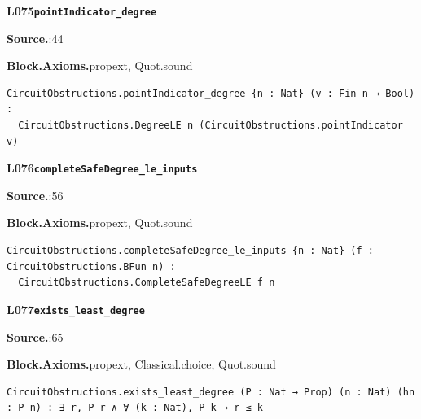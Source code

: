 \par\medskip\noindent\begin{minipage}{\textwidth}
{\small\bfseries L075\enspace\texttt{pointIndicator\_degree}\par}
{\footnotesize\raggedright\textbf{Source.}\enspace{}:44\par
\textbf{Block.}\quad\textbf{Axioms.}\enspace propext, Quot.sound\par}\nopagebreak
\begin{lstlisting}
CircuitObstructions.pointIndicator_degree {n : Nat} (v : Fin n → Bool) :
  CircuitObstructions.DegreeLE n (CircuitObstructions.pointIndicator v)
\end{lstlisting}
\end{minipage}\par

\par\medskip\noindent\begin{minipage}{\textwidth}
{\small\bfseries L076\enspace\texttt{completeSafeDegree\_le\_inputs}\par}
{\footnotesize\raggedright\textbf{Source.}\enspace{}:56\par
\textbf{Block.}\quad\textbf{Axioms.}\enspace propext, Quot.sound\par}\nopagebreak
\begin{lstlisting}
CircuitObstructions.completeSafeDegree_le_inputs {n : Nat} (f : CircuitObstructions.BFun n) :
  CircuitObstructions.CompleteSafeDegreeLE f n
\end{lstlisting}
\end{minipage}\par

\par\medskip\noindent\begin{minipage}{\textwidth}
{\small\bfseries L077\enspace\texttt{exists\_least\_degree}\par}
{\footnotesize\raggedright\textbf{Source.}\enspace{}:65\par
\textbf{Block.}\quad\textbf{Axioms.}\enspace propext, Classical.choice, Quot.sound\par}\nopagebreak
\begin{lstlisting}
CircuitObstructions.exists_least_degree (P : Nat → Prop) (n : Nat) (hn : P n) : ∃ r, P r ∧ ∀ (k : Nat), P k → r ≤ k
\end{lstlisting}
\end{minipage}\par


